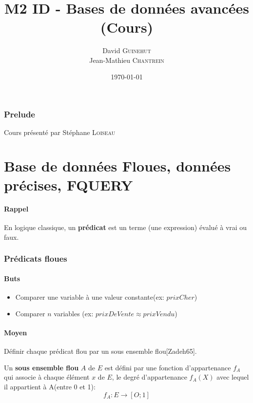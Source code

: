 \documentclass[a4paper,11pt]{article}
\title{M2 ID - Bases de données avancées \\ \normalsize (Cours)}
\author{David \textsc{Guinehut}\\Jean-Mathieu \textsc{Chantrein}}
\date{\today}
\begin{document}
	\renewcommand{\headrulewidth}{0.001pt}
	
	\pagestyle{fancy}
	
	\maketitle

	\tableofcontents

\section*{Prelude}
Cours présenté par Stéphane \textsc{Loiseau}

\part{Base de données Floues, données précises, FQUERY}

\subsection*{Rappel}
En logique classique, un \textbf{prédicat} est un terme (une expression) évalué à vrai ou faux.

\section{Prédicats floues}

\subsection{Buts}
\begin{itemize}
\item Comparer une variable à une valeur constante(ex: $prixCher$)
\item Comparer $n$ variables (ex: $prixDeVente \approx prixVendu$)
\end{itemize}

\subsection{Moyen}
Définir chaque prédicat flou par un sous ensemble flou[Zadeh65].


Un \textbf{sous ensemble flou} $A$ de $E$ est défini par une fonction d'appartenance $f_A$ qui associe à chaque élément $x$ de $E$, le degré d'appartenance $f_A(X)$ avec lequel il appartient à A(entre 0 et 1):$$f_A:E\rightarrow[O;1]$$
\end{document}
